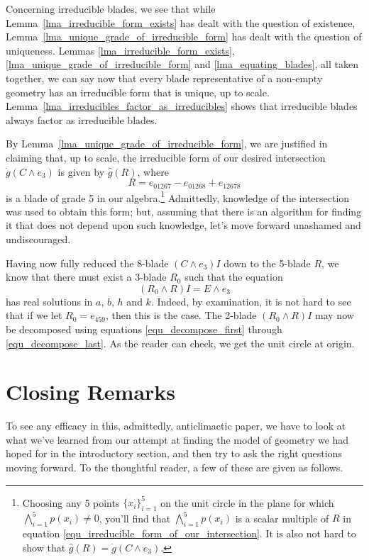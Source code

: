 \documentclass{birkjour}
\theoremstyle{definition}
\theoremstyle{remark}
\numberwithin{equation}{section}
\newcommand{\gd}{\dot{g}}
\newcommand{\gh}{\hat{g}}
\begin{document}
Concerning irreducible blades, we see that while Lemma~\ref{lma_irreducible_form_exists} has dealt with
the question of existence, Lemma~\ref{lma_unique_grade_of_irreducible_form} has dealt with the question of uniqueness.  Lemmas \ref{lma_irreducible_form_exists}, \ref{lma_unique_grade_of_irreducible_form}
and \ref{lma_equating_blades}, all taken together, we can
say now that every blade representative of a non-empty geometry has an irreducible form that
is unique, up to scale.
Lemma~\ref{lma_irreducibles_factor_as_irreducibles} shows that irreducible blades always factor
as irreducible blades.

By Lemma~\ref{lma_unique_grade_of_irreducible_form}, we are justified in
claiming that, up to scale, the irreducible form of
our desired intersection $\gd(C\wedge e_3)$ is given by $\gh(R)$, where
\begin{equation}\label{equ_irreducible_form_of_our_intersection}
R = e_{01267} - e_{01268} + e_{12678}
\end{equation}
is a blade of grade 5 in our algebra.\footnote{Choosing any 5 points $\{x_i\}_{i=1}^5$ on
the unit circle in the plane for which $\bigwedge_{i=1}^5 p(x_i)\neq 0$, you'll find that $\bigwedge_{i=1}^5 p(x_i)$
is a scalar multiple of $R$ in equation \eqref{equ_irreducible_form_of_our_intersection}.  It is also not
hard to show that $\gh(R)=\gd(C\wedge e_3)$.}
Admittedly, knowledge of the intersection was used
to obtain this form; but, assuming that there is an algorithm for finding it
that does not depend upon such knowledge, let's move forward unashamed
and undiscouraged.

Having now fully reduced the 8-blade $(C\wedge e_3)I$ down to the 5-blade $R$, we know
that there must exist a 3-blade $R_0$ such that the equation
\begin{equation*}
(R_0\wedge R)I = E\wedge e_3
\end{equation*}
has real solutions in $a$, $b$, $h$ and $k$.
Indeed, by examination, it is not hard to see that if we let $R_0=e_{459}$, then this is the case.
The 2-blade $(R_0\wedge R)I$ may now be decomposed using equations \eqref{equ_decompose_first} through \eqref{equ_decompose_last}.
As the reader can check, we get the unit circle at origin.

\section{Closing Remarks}

To see any efficacy in this, admittedly, anticlimactic paper, we have to look at what
we've learned from our attempt at finding the model of geometry we had hoped
for in the introductory section, and then try to ask the right questions moving forward.
To the thoughtful reader, a few of these are given as follows.
\end{document}
